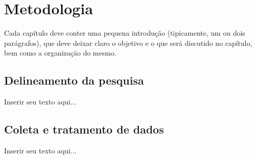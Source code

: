
\chapter{Metodologia}
\label{chap_metodologia}
Cada capítulo deve conter uma pequena introdução (tipicamente, um ou dois parágrafos), que deve deixar claro o objetivo e o que será discutido no capítulo, bem como a organização do mesmo.

\section{Delineamento da pesquisa}
\label{sec_delineamento_da_pesquisa}

Inserir seu texto aqui...

\section{Coleta e tratamento de dados}
\label{sec_coleta_e_tratamento_de_dados}

Inserir seu texto aqui...
